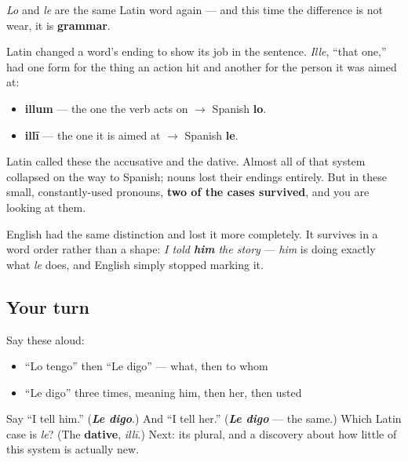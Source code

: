 \begin{cousinweb}
\emph{Lo} and \emph{le} are the same Latin word again — and this time the difference is not wear, it is \textbf{grammar}.

Latin changed a word's ending to show its job in the sentence. \emph{Ille}, \textquotedblleft{}that one,\textquotedblright{} had one form for the thing an action hit and another for the person it was aimed at:

\begin{itemize}
\raggedright
  \item \textbf{illum} — the one the verb acts on $\to$ Spanish \textbf{lo}.
  \item \textbf{illī} — the one it is aimed at $\to$ Spanish \textbf{le}.
\end{itemize}

Latin called these the accusative and the dative. Almost all of that system collapsed on the way to Spanish; nouns lost their endings entirely. But in these small, constantly-used pronouns, \textbf{two of the cases survived}, and you are looking at them.

English had the same distinction and lost it more completely. It survives in a word order rather than a shape: \emph{I told \textbf{him} the story} — \emph{him} is doing exactly what \emph{le} does, and English simply stopped marking it.
\end{cousinweb}

\subsection*{Your turn}
Say these aloud:

\begin{itemize}
\raggedright
  \item \textquotedblleft{}Lo tengo\textquotedblright{} then \textquotedblleft{}Le digo\textquotedblright{} — what, then to whom
  \item \textquotedblleft{}Le digo\textquotedblright{} three times, meaning him, then her, then usted
\end{itemize}

\begin{tcolorbox}[breakable,colback=teal!4,colframe=teal!35!black,title={Before you move on}]
Say \textquotedblleft{}I tell him.\textquotedblright{} (\emph{\textbf{Le digo}}.) And \textquotedblleft{}I tell her.\textquotedblright{} (\emph{\textbf{Le digo}} — the same.) Which Latin case is \emph{le}? (The \textbf{dative}, \emph{illī}.) Next: its plural, and a discovery about how little of this system is actually new.
\end{tcolorbox}
